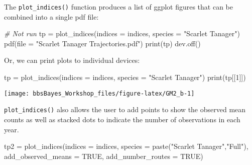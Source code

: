 \documentclass[
]{book}
\newenvironment{Shaded}{\begin{snugshade}}{\end{snugshade}}
\newcommand{\AttributeTok}[1]{\textcolor[rgb]{0.77,0.63,0.00}{#1}}
\newcommand{\CommentTok}[1]{\textcolor[rgb]{0.56,0.35,0.01}{\textit{#1}}}
\newcommand{\ConstantTok}[1]{\textcolor[rgb]{0.00,0.00,0.00}{#1}}
\newcommand{\DecValTok}[1]{\textcolor[rgb]{0.00,0.00,0.81}{#1}}
\newcommand{\FunctionTok}[1]{\textcolor[rgb]{0.00,0.00,0.00}{#1}}
\newcommand{\NormalTok}[1]{#1}
\newcommand{\OtherTok}[1]{\textcolor[rgb]{0.56,0.35,0.01}{#1}}
\newcommand{\StringTok}[1]{\textcolor[rgb]{0.31,0.60,0.02}{#1}}
\begin{document}
The \texttt{plot\_indices()} function produces a list of ggplot figures that can be combined into a single pdf file:

\begin{Shaded}
\begin{Highlighting}[]
\CommentTok{\# Not run}
\NormalTok{tp }\OtherTok{=} \FunctionTok{plot\_indices}\NormalTok{(}\AttributeTok{indices =}\NormalTok{ indices,}
                         \AttributeTok{species =} \StringTok{"Scarlet Tanager"}\NormalTok{)}
\FunctionTok{pdf}\NormalTok{(}\AttributeTok{file =} \StringTok{"Scarlet Tanager Trajectories.pdf"}\NormalTok{)}
\FunctionTok{print}\NormalTok{(tp)}
\FunctionTok{dev.off}\NormalTok{()}
\end{Highlighting}
\end{Shaded}

Or, we can print plots to individual devices:

\begin{Shaded}
\begin{Highlighting}[]
\NormalTok{tp }\OtherTok{=} \FunctionTok{plot\_indices}\NormalTok{(}\AttributeTok{indices =}\NormalTok{ indices,}
                         \AttributeTok{species =} \StringTok{"Scarlet Tanager"}\NormalTok{)}
\FunctionTok{print}\NormalTok{(tp[[}\DecValTok{1}\NormalTok{]])}
\end{Highlighting}
\end{Shaded}

\begin{center}\texttt{[image: bbsBayes\_Workshop\_files/figure-latex/GM2\_b-1]} \end{center}

\texttt{plot\_indices()} also allows the user to add points to show the observed mean counts as well as stacked dots to indicate the number of observations in each year.

\begin{Shaded}
\begin{Highlighting}[]
\NormalTok{tp2 }\OtherTok{=} \FunctionTok{plot\_indices}\NormalTok{(}\AttributeTok{indices =}\NormalTok{ indices,}
                         \AttributeTok{species =} \FunctionTok{paste}\NormalTok{(}\StringTok{"Scarlet Tanager"}\NormalTok{,}\StringTok{"Full"}\NormalTok{),}
                  \AttributeTok{add\_observed\_means =} \ConstantTok{TRUE}\NormalTok{,}
                  \AttributeTok{add\_number\_routes =} \ConstantTok{TRUE}\NormalTok{)}
\end{Highlighting}
\end{Shaded}
\end{document}
